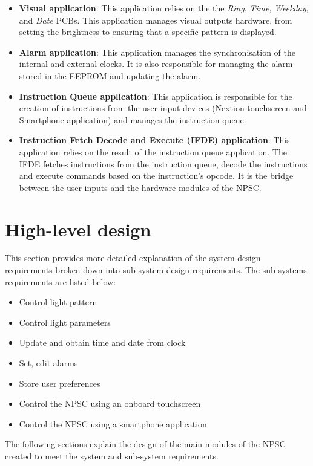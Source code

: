 \begin{itemize}
\item \textbf{Visual application}: This application relies on the the \textit{Ring}, \textit{Time}, \textit{Weekday}, and \textit{Date} PCBs. This application manages visual outputs hardware, from setting the brightness to ensuring that a specific pattern is displayed.
\item \textbf{Alarm application}: This application manages the synchronisation of the internal and external clocks. It is also responsible for managing the alarm stored in the EEPROM and updating the alarm.
\item \textbf{Instruction Queue application}: This application is responsible for the creation of instructions from the user input devices (Nextion touchscreen and Smartphone application) and manages the instruction queue.
\item \textbf{Instruction Fetch Decode and Execute (IFDE) application}: This application relies on the result of the instruction queue application. The IFDE fetches instructions from the instruction queue, decode the instructions and execute commands based on the instruction's opcode. It is the bridge between the user inputs and the hardware modules of the NPSC.
\end{itemize}

\section{High-level design}
This section provides more detailed explanation of the system design requirements broken down into sub-system design requirements. The sub-systems requirements are listed below:
\begin{itemize}
\item Control light pattern
\item Control light parameters
\item Update and obtain time and date from clock
\item Set, edit alarms
\item Store user preferences
\item Control the NPSC using an onboard touchscreen
\item Control the NPSC using a smartphone application
\end{itemize}
The following sections explain the design of the main modules of the NPSC created to meet the system and sub-system requirements.


